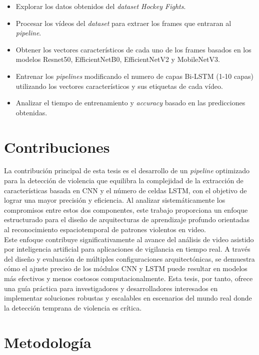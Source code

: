 \begin{itemize}
    \item Explorar los datos obtenidos del \textit{dataset Hockey 
    Fights}.
    \item Procesar los vídeos del \textit{dataset} para extraer 
    los frames que entraran al \textit{pipeline}.
    \item Obtener los vectores característicos de cada uno de los 
    frames basados en los modelos Resnet50, EfficientNetB0, 
    EfficientNetV2 y MobileNetV3. 
    \item Entrenar los \textit{pipelines} modificando el numero 
    de capas Bi-LSTM (1-10 capas) utilizando los 
    vectores característicos y sus etiquetas de cada vídeo.
    \item Analizar el tiempo de entrenamiento y \textit{accuracy} basado en las 
    predicciones obtenidas.
\end{itemize}

\section{Contribuciones}\label{contribuciones}

La contribución principal de esta tesis es el desarrollo 
de un \textit{pipeline} optimizado para la detección de violencia 
que equilibra la complejidad de la extracción de 
características basada en CNN y el número de celdas LSTM, 
con el objetivo de lograr una mayor precisión y eficiencia. 
Al analizar sistemáticamente los compromisos entre estos 
dos componentes, este trabajo proporciona un enfoque 
estructurado para el diseño de arquitecturas de aprendizaje 
profundo orientadas al reconocimiento espaciotemporal de 
patrones violentos en video.\\

Este enfoque contribuye significativamente al avance del 
análisis de video asistido por inteligencia artificial 
para aplicaciones de vigilancia en tiempo real. A través 
del diseño y evaluación de múltiples configuraciones 
arquitectónicas, se demuestra cómo el ajuste preciso de 
los módulos CNN y LSTM puede resultar en modelos más 
efectivos y menos costosos computacionalmente. Esta tesis, 
por tanto, ofrece una guía práctica para investigadores y 
desarrolladores interesados en implementar soluciones 
robustas y escalables en escenarios del mundo real donde 
la detección temprana de violencia es crítica.

\section{Metodología} \label{metodologia}

